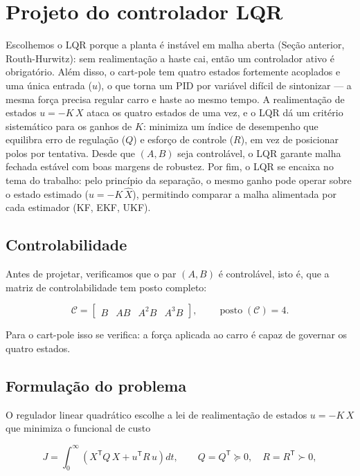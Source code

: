 \documentclass[brazil, 12pt]{article}
\begin{document}
\section{Projeto do controlador LQR}

Escolhemos o LQR porque a planta é instável em malha aberta (Seção anterior,
Routh-Hurwitz): sem realimentação a haste cai, então um controlador ativo é
obrigatório. Além disso, o cart-pole tem quatro estados fortemente acoplados e
uma única entrada ($u$), o que torna um PID por variável difícil de sintonizar
--- a mesma força precisa regular carro e haste ao mesmo tempo. A realimentação
de estados $u=-K\,X$ ataca os quatro estados de uma vez, e o LQR dá um critério
sistemático para os ganhos de $K$: minimiza um índice de desempenho que
equilibra erro de regulação ($Q$) e esforço de controle ($R$), em vez de
posicionar polos por tentativa. Desde que $(A,B)$ seja controlável, o LQR
garante malha fechada estável com boas margens de robustez. Por fim, o LQR se
encaixa no tema do trabalho: pelo princípio da separação, o mesmo ganho pode
operar sobre o estado estimado ($u=-K\,\hat X$), permitindo comparar a malha
alimentada por cada estimador (KF, EKF, UKF).

\subsection{Controlabilidade}

Antes de projetar, verificamos que o par $(A,B)$ é controlável, isto é, que a
matriz de controlabilidade tem posto completo:

\[
\mathcal{C} = \begin{bmatrix} B & AB & A^{2}B & A^{3}B \end{bmatrix},
\qquad \operatorname{posto}(\mathcal{C}) = 4.
\]

Para o cart-pole isso se verifica: a força aplicada ao carro é capaz de
governar os quatro estados.

\subsection{Formulação do problema}

O regulador linear quadrático escolhe a lei de realimentação de estados
$u = -K\,X$ que minimiza o funcional de custo

\[
J = \int_{0}^{\infty}
\left( X^{\mathsf T} Q\, X + u^{\mathsf T} R\, u \right) dt,
\qquad Q = Q^{\mathsf T} \succeq 0, \quad R = R^{\mathsf T} \succ 0,
\]
\end{document}
